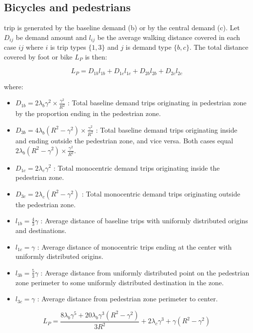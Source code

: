 \documentclass{article}
\begin{document}
\subsection{Bicycles and pedestrians}

trip is generated by the baseline demand (b) or by the central demand (c). Let $D_{ij}$ be demand amount and $l_{ij}$ be the average walking distance covered in each case $ij$ where $i$ is trip types $\{1,3\}$ and $j$ is demand type $\{b,c\}$. The total distance covered by foot or bike $L_P$ is then:

\begin{equation}
     L_P = D_{1b}l_{1b} + D_{1c}l_{1c} + D_{2b}l_{2b} + D_{2c}l_{2c}
\end{equation}

where: 
\begin{itemize}
    \item $D_{1b} = 2 \lambda_b \gamma^2 \times \frac{\gamma^2}{R^2}$ : Total baseline demand trips originating in pedestrian zone by the proportion ending in the pedestrian zone.
    \item $D_{3b} = 4 \lambda_b (R^2 - \gamma^2) \times \frac{\gamma^2}{R^2}$ : Total baseline demand trips originating inside and ending outside the pedestrian zone, and vice versa. Both cases equal $2\lambda_b (R^2 - \gamma^2) \times \frac{\gamma^2}{R^2}$.
    \item $D_{1c} = 2 \lambda_c \gamma^2$ : Total monocentric demand trips originating inside the pedestrian zone.
    \item $D_{3c} = 2 \lambda_c (R^2 - \gamma^2)$ : Total monocentric demand trips originating outside the pedestrian zone.
    \item $l_{1b} = \frac{4}{3}\gamma$ : Average distance of baseline trips with uniformly distributed origins and destinations.
    \item $l_{1c} = \gamma$ : Average distance of monocentric trips ending at the center with uniformly distributed origins.
    \item $l_{3b} = \frac{5}{3}\gamma$ : Average distance from uniformly distributed point on the pedestrian zone perimeter to some uniformly distributed destination in the zone.
    \item $l_{3c} = \gamma$ : Average distance from pedestrian zone perimeter to center.
\end{itemize}


\begin{equation}
L_P = \frac{8\lambda_b \gamma^5 + 20\lambda_b \gamma^3 (R^2-\gamma^2)}{3R^2} + 2\lambda_c \gamma^3 + \gamma (R^2 - \gamma^2)
\end{equation}
\end{document}
